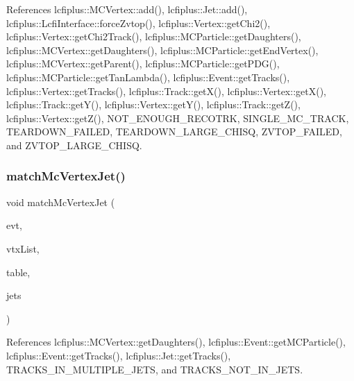 References lcfiplus\+::\+M\+C\+Vertex\+::add(), lcfiplus\+::\+Jet\+::add(), lcfiplus\+::\+Lcfi\+Interface\+::force\+Zvtop(), lcfiplus\+::\+Vertex\+::get\+Chi2(), lcfiplus\+::\+Vertex\+::get\+Chi2\+Track(), lcfiplus\+::\+M\+C\+Particle\+::get\+Daughters(), lcfiplus\+::\+M\+C\+Vertex\+::get\+Daughters(), lcfiplus\+::\+M\+C\+Particle\+::get\+End\+Vertex(), lcfiplus\+::\+M\+C\+Vertex\+::get\+Parent(), lcfiplus\+::\+M\+C\+Particle\+::get\+P\+D\+G(), lcfiplus\+::\+M\+C\+Particle\+::get\+Tan\+Lambda(), lcfiplus\+::\+Event\+::get\+Tracks(), lcfiplus\+::\+Vertex\+::get\+Tracks(), lcfiplus\+::\+Track\+::get\+X(), lcfiplus\+::\+Vertex\+::get\+X(), lcfiplus\+::\+Track\+::get\+Y(), lcfiplus\+::\+Vertex\+::get\+Y(), lcfiplus\+::\+Track\+::get\+Z(), lcfiplus\+::\+Vertex\+::get\+Z(), N\+O\+T\+\_\+\+E\+N\+O\+U\+G\+H\+\_\+\+R\+E\+C\+O\+T\+RK, S\+I\+N\+G\+L\+E\+\_\+\+M\+C\+\_\+\+T\+R\+A\+CK, T\+E\+A\+R\+D\+O\+W\+N\+\_\+\+F\+A\+I\+L\+ED, T\+E\+A\+R\+D\+O\+W\+N\+\_\+\+L\+A\+R\+G\+E\+\_\+\+C\+H\+I\+SQ, Z\+V\+T\+O\+P\+\_\+\+F\+A\+I\+L\+ED, and Z\+V\+T\+O\+P\+\_\+\+L\+A\+R\+G\+E\+\_\+\+C\+H\+I\+SQ.

\mbox{\label{Driver_8cc_acf305dec8cd6439013d0878fd783e647}} 
\subsubsection{match\+Mc\+Vertex\+Jet()}
{\footnotesize\ttfamily void match\+Mc\+Vertex\+Jet (\begin{DoxyParamCaption}\item[{const \textbf{ Event} \&}]{evt,  }\item[{const vector$<$ \textbf{ M\+C\+Vertex} $\ast$$>$ \&}]{vtx\+List,  }\item[{map$<$ \textbf{ M\+C\+Vertex} $\ast$, int $>$ \&}]{table,  }\item[{const vector$<$ const \textbf{ Jet} $\ast$$>$ \&}]{jets }\end{DoxyParamCaption})}



References lcfiplus\+::\+M\+C\+Vertex\+::get\+Daughters(), lcfiplus\+::\+Event\+::get\+M\+C\+Particle(), lcfiplus\+::\+Event\+::get\+Tracks(), lcfiplus\+::\+Jet\+::get\+Tracks(), T\+R\+A\+C\+K\+S\+\_\+\+I\+N\+\_\+\+M\+U\+L\+T\+I\+P\+L\+E\+\_\+\+J\+E\+TS, and T\+R\+A\+C\+K\+S\+\_\+\+N\+O\+T\+\_\+\+I\+N\+\_\+\+J\+E\+TS.

\mbox{\label{Driver_8cc_a31c2c9f1b93b23699bc267a89f2ebc72}} 
